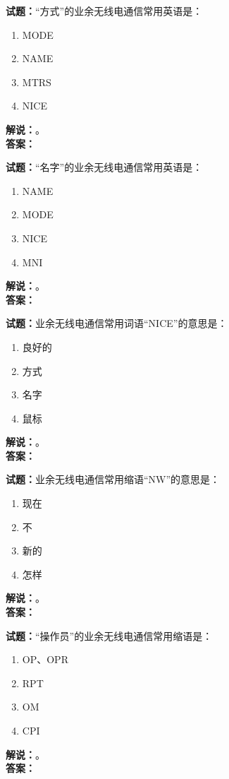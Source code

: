 \documentclass{ctexbook}
\begin{document}
\bigskip

\noindent\textbf{试题：}“方式”的业余无线电通信常用英语是：
\begin{enumerate}[leftmargin=3em]
  \item MODE
  \item NAME
  \item MTRS
  \item NICE
\end{enumerate}
\noindent\textbf{解说：}\textbf{}。\\\noindent\textbf{答案：}

\bigskip

\noindent\textbf{试题：}“名字”的业余无线电通信常用英语是：
\begin{enumerate}[leftmargin=3em]
  \item NAME
  \item MODE
  \item NICE
  \item MNI
\end{enumerate}
\noindent\textbf{解说：}\textbf{}。\\\noindent\textbf{答案：}

\bigskip

\noindent\textbf{试题：}业余无线电通信常用词语“NICE”的意思是：
\begin{enumerate}[leftmargin=3em]
  \item 良好的
  \item 方式
  \item 名字
  \item 鼠标
\end{enumerate}
\noindent\textbf{解说：}\textbf{}。\\\noindent\textbf{答案：}

\bigskip

\noindent\textbf{试题：}业余无线电通信常用缩语“NW”的意思是：
\begin{enumerate}[leftmargin=3em]
  \item 现在
  \item 不
  \item 新的
  \item 怎样
\end{enumerate}
\noindent\textbf{解说：}\textbf{}。\\\noindent\textbf{答案：}

\bigskip

\noindent\textbf{试题：}“操作员”的业余无线电通信常用缩语是：
\begin{enumerate}[leftmargin=3em]
  \item OP、OPR
  \item RPT
  \item OM
  \item CPI
\end{enumerate}
\noindent\textbf{解说：}\textbf{}。\\\noindent\textbf{答案：}
\end{document}
